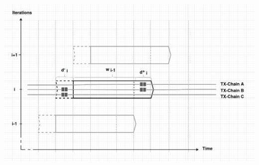 
% 	

\begin{center}
    \includegraphics[width=1\linewidth]{fig/iterations_general}%
  \label{fig:aggr}
\end{center}




